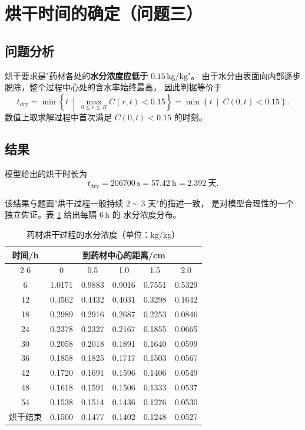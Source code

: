 \documentclass[12pt,a4paper,fontset=none]{ctexart}
\begin{document}
\section{烘干时间的确定（问题三）}

\subsection{问题分析}

烘干要求是"药材各处的\textbf{水分浓度应低于} $0.15$\,kg/kg"。
由于水分由表面向内部逐步脱除，整个过程中心处的含水率始终最高，
因此判据等价于
\begin{equation}
  t_{\mathrm{dry}}=\min\left\{t\ \middle|\
  \max_{0\le r\le R}C(r,t)<0.15\right\}
  =\min\left\{t\ \middle|\ C(0,t)<0.15\right\}.
  \label{eq:p3-criterion}
\end{equation}
数值上取求解过程中首次满足 $C(0,t)<0.15$ 的时刻。

\subsection{结果}

模型给出的烘干时长为
\begin{equation}
  t_{\mathrm{dry}}=206700\ \mathrm{s}=57.42\ \mathrm{h}=2.392\ \text{天}.
\end{equation}

该结果与题面"烘干过程一般持续 $2\sim3$ 天"的描述一致，
是对模型合理性的一个独立佐证。表 \ref{tab:p3} 给出每隔 $6$\,h 的
水分浓度分布。

\begin{table}[htbp]
  \centering
  \caption{药材烘干过程的水分浓度（单位：kg/kg）}
  \label{tab:p3}
  \begin{tabular}{cccccc}
    \toprule
    \multirow{2}{*}{时间/h} & \multicolumn{5}{c}{到药材中心的距离/cm} \\
    \cmidrule(lr){2-6}
     & 0     & 0.5   & 1.0   & 1.5   & 2.0 \\
    \midrule
    6  & 1.0171 & 0.9883 & 0.9016 & 0.7551 & 0.5329 \\
    12 & 0.4562 & 0.4432 & 0.4031 & 0.3298 & 0.1642 \\
    18 & 0.2989 & 0.2916 & 0.2687 & 0.2253 & 0.0846 \\
    24 & 0.2378 & 0.2327 & 0.2167 & 0.1855 & 0.0665 \\
    30 & 0.2058 & 0.2018 & 0.1891 & 0.1640 & 0.0599 \\
    36 & 0.1858 & 0.1825 & 0.1717 & 0.1503 & 0.0567 \\
    42 & 0.1720 & 0.1691 & 0.1596 & 0.1406 & 0.0549 \\
    48 & 0.1618 & 0.1591 & 0.1506 & 0.1333 & 0.0537 \\
    54 & 0.1538 & 0.1514 & 0.1436 & 0.1276 & 0.0530 \\
    烘干结束 & 0.1500 & 0.1477 & 0.1402 & 0.1248 & 0.0527 \\
    \bottomrule
  \end{tabular}
\end{table}
\end{document}
